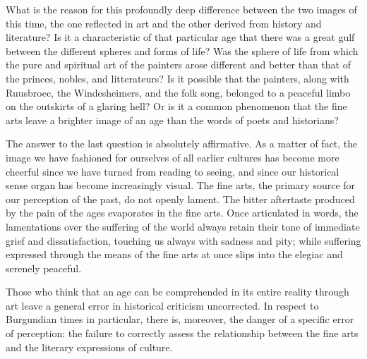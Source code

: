 What is the reason for this profoundly deep difference between the two
images of this time, the one reflected in art and the other derived from
history and literature? Is it a characteristic of that particular age
that there was a great gulf between the different spheres and forms of
life? Was the sphere of life from which the pure and spiritual art of
the painters arose different and better than that of the princes,
nobles, and litterateurs? Is it possible that the painters, along with
Ruusbroec, the Windesheimers, and the folk song, belonged to a peaceful
limbo on the outskirts of a glaring hell? Or is it a common phenomenon
that the fine arts leave a brighter image of an age than the words of
poets and historians?

The answer to the last question is absolutely affirmative. As a matter
of fact, the image we have fashioned for ourselves of all earlier
cultures has become more cheerful since we have turned from reading to
seeing, and since our historical sense organ has become increasingly
visual. The fine arts, the primary source for our perception of the
past, do not openly lament. The bitter aftertaste produced by the pain
of the ages evaporates in the fine arts. Once articulated in words, the
lamentations over the suffering of the world always retain their tone of
immediate grief and dissatisfaction, touching us always with sadness and
pity; while suffering expressed through the means of the fine arts at
once slips into the elegiac and serenely peaceful.

Those who think that an age can be comprehended in its entire reality
through art leave a general error in historical criticism uncorrected.
In respect to Burgundian times in particular, there is, moreover, the
danger of a specific error of perception: the failure to correctly
assess the relationship between the fine arts and the literary
expressions of culture.

